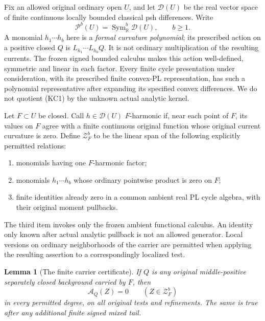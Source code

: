 \documentclass[11pt,a4paper]{article}
\numberwithin{equation}{section}
\newtheorem{lemma}[theorem]{Lemma}
\theoremstyle{definition}
\theoremstyle{remark}
\begin{document}
Fix an allowed original ordinary open \(U\), and let
\(\mathcal D(U)\) be the real vector space of finite continuous
locally bounded classical psh differences. Write
\[
                \mathcal P^b(U)=\operatorname{Sym}^b_{\mathbb R}
                                      \mathcal D(U),\qquad b\ge1.
 \tag{KC1}
\]
A monomial \(h_1\cdots h_b\) here is a \emph{formal curvature
polynomial}; its prescribed action on a positive closed \(Q\) is
\(L_{h_1}\cdots L_{h_b}Q\). It is not ordinary multiplication of
the resulting currents. The frozen signed bounded calculus makes
this action well-defined, symmetric and linear in each factor.
Every finite cycle presentation under consideration, with its
prescribed finite convex-PL representation, has such a polynomial
representative after expanding its specified convex differences.
We do not quotient (KC1) by the unknown actual analytic kernel.

Let \(F\subset U\) be closed. Call \(h\in\mathcal D(U)\)
\(F\)-harmonic if, near each point of \(F\), its values on \(F\)
agree with a finite continuous original function whose original
current curvature is zero. Define \(\mathcal Z_F^b\) to be the
linear span of the following explicitly permitted relations:
\begin{enumerate}
\item monomials having one \(F\)-harmonic factor;
\item monomials \(h_1\cdots h_b\) whose ordinary pointwise product
      is zero on \(F\);
\item finite identities already zero in a common ambient real
      PL cycle algebra, with their original moment pullbacks.
\end{enumerate}
The third item invokes only the frozen ambient functional calculus.
An identity only known after actual analytic pullback is not an
allowed generator. Local versions on ordinary neighborhoods of
the carrier are permitted when applying the resulting assertion
to a correspondingly localized test.

\begin{lemma}[The finite carrier certificate]
\label{lem:r12-finite-carrier-certificate}
If \(Q\) is any original middle-positive separately closed
background carried by \(F\), then
\[
                              \mathcal A_Q(Z)=0
                              \qquad(Z\in\mathcal Z_F^b)
 \tag{KC2}
\]
in every permitted degree, on all original tests and refinements.
The same is true after any additional finite signed mixed tail.
\end{lemma}
\end{document}
